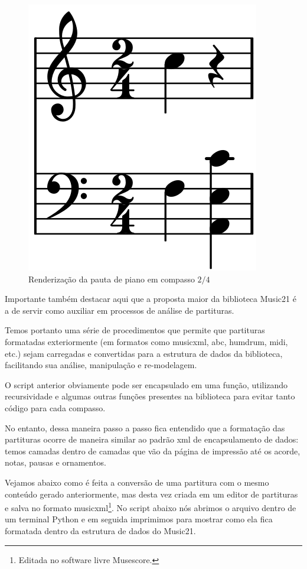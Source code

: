 \documentclass[
	12pt,				%
	openright,			%
	twoside,			%
	a4paper,			%
	english,			%
	french,				%
	spanish,			%
	brazil				%
	]{abntex2}
\begin{document}
\begin{figure}[!h]
	\caption{\label{fig_grafico} Renderização da pauta de piano em compasso $2/4$} 
	\begin{center}
	    \includegraphics[scale=0.25]{estudosM21/pautaM21.png}
	\end{center}
\end{figure}

Importante também destacar aqui que a proposta maior da biblioteca Music21 é a de servir como auxiliar em processos de análise de partituras. 

Temos portanto uma série de procedimentos que permite que partituras formatadas exteriormente (em formatos como musicxml, abc, humdrum, midi, etc.) sejam carregadas e convertidas para a estrutura de dados da biblioteca, facilitando sua análise, manipulação e re-modelagem. 

O script anterior obviamente pode ser encapsulado em uma função, utilizando recursividade e algumas outras funções presentes na biblioteca para evitar tanto código para cada compasso. 

No entanto, dessa maneira passo a passo fica entendido que a formatação das partituras ocorre de maneira similar ao padrão xml de encapsulamento de dados: temos camadas dentro de camadas que vão da página de impressão até os acorde, notas, pausas e ornamentos.

Vejamos abaixo como é feita a conversão de uma partitura com o mesmo conteúdo gerado anteriormente, mas desta vez criada em um editor de partituras e salva no formato musicxml\footnote{Editada no software livre Musescore.}. No script abaixo nós abrimos o arquivo dentro de um terminal Python e em seguida imprimimos para mostrar como ela fica formatada dentro da estrutura de dados do Music21.
\end{document}
